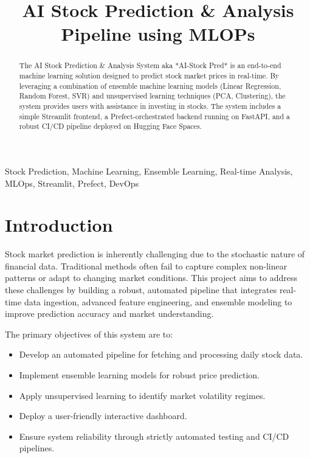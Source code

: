 \documentclass[conference]{IEEEtran}
\begin{document}
\title{AI Stock Prediction \& Analysis Pipeline using MLOPs}

\author{
}

\maketitle

\begin{abstract}
The AI Stock Prediction \& Analysis System aka *AI-Stock Pred* is an end-to-end machine learning solution designed to predict stock market prices in real-time. By leveraging a combination of ensemble machine learning models (Linear Regression, Random Forest, SVR) and unsupervised learning techniques (PCA, Clustering), the system provides users with assistance in investing in stocks. The system includes a simple Streamlit frontend, a Prefect-orchestrated backend running on FastAPI, and a robust CI/CD pipeline deployed on Hugging Face Spaces.
\end{abstract}

\begin{IEEEkeywords}
Stock Prediction, Machine Learning, Ensemble Learning, Real-time Analysis, MLOps, Streamlit, Prefect, DevOps
\end{IEEEkeywords}

\section{Introduction}
Stock market prediction is inherently challenging due to the stochastic nature of financial data. Traditional methods often fail to capture complex non-linear patterns or adapt to changing market conditions. This project aims to address these challenges by building a robust, automated pipeline that integrates real-time data ingestion, advanced feature engineering, and ensemble modeling to improve prediction accuracy and market understanding.

The primary objectives of this system are to:
\begin{itemize}
    \item Develop an automated pipeline for fetching and processing daily stock data.
    \item Implement ensemble learning models for robust price prediction.
    \item Apply unsupervised learning to identify market volatility regimes.
    \item Deploy a user-friendly interactive dashboard.
    \item Ensure system reliability through strictly automated testing and CI/CD pipelines.
\end{itemize}
\end{document}
